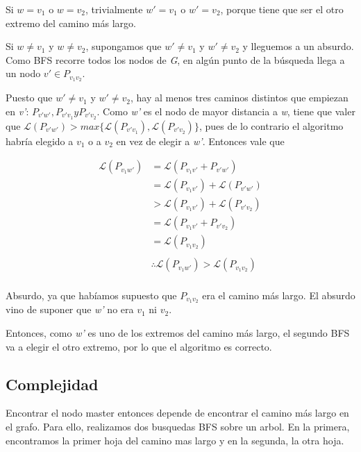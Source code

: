 \documentclass[a4paper]{report}
\begin{document}
Si $w = v_{1}$ o $w = v_{2}$, trivialmente $w' = v_{1}$ o $w' = v_{2}$, porque tiene que ser el otro extremo del camino más largo.

Si $w \neq v_{1}$ y $w \neq v_{2}$, supongamos que $w' \neq v_{1}$ y $w' \neq v_{2}$ y lleguemos a un absurdo. Como BFS recorre todos los nodos de \textit{G}, en algún punto de la búsqueda llega a un nodo $v' \in P_{v_{1} v_{2}}$.

Puesto que $w' \neq v_{1}$ y $w' \neq v_{2}$, hay al menos tres caminos distintos que empiezan en \textit{v'}: $P_{v'w'}, P_{v' v_{1}} y P_{v' v_{2}}$. Como \textit{w'} es el nodo de mayor distancia a \textit{w}, tiene que valer que $\mathcal{L}(P_{v'w'}) > max\{ \mathcal{L}(P_{v' v_{1}}), \mathcal{L}(P_{v' v_{2}}) \}$, pues de lo contrario el algoritmo habría elegido a $v_{1}$ o a $v_{2}$ en vez de elegir a \textit{w'}. Entonces vale que

\begin{align*}
    \mathcal{L}(P_{v_{1} w'}) &= \mathcal{L}(P_{v_{1} v'} + P_{v'w'}) \\
    &= \mathcal{L}(P_{v_{1} v'}) + \mathcal{L}(P_{v'w'}) \\
    &> \mathcal{L}(P_{v_{1} v'}) + \mathcal{L}(P_{v' v_{2}}) \\
    &= \mathcal{L}(P_{v_{1} v'} + P_{v' v_{2}}) \\
    &= \mathcal{L}(P_{v_{1} v_{2}}) \\
    & \\
    & \therefore \mathcal{L}(P_{v_{1} w'}) > \mathcal{L}(P_{v_{1} v_{2}}) \\
\end{align*}

Absurdo, ya que habíamos supuesto que $P_{v_{1} v_{2}}$ era el camino más largo. El absurdo vino de suponer que \textit{w'} no era $v_{1}$ ni $v_{2}$.

Entonces, como \textit{w'} es uno de los extremos del camino más largo, el segundo BFS va a elegir el otro extremo, por lo que el algoritmo es correcto.

\subsection{Complejidad}

Encontrar el nodo master entonces depende de encontrar el camino más largo en el grafo. 
Para ello, realizamos dos busquedas BFS sobre un arbol. En la primera, encontramos la primer hoja del camino mas largo y en la segunda, la otra hoja. 
\end{document}
